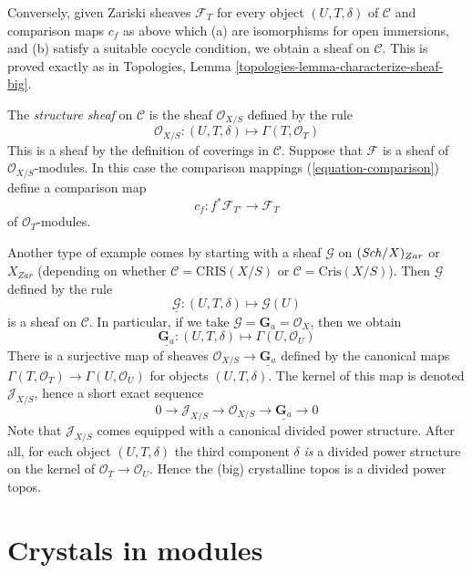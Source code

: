 \medskip\noindent
Conversely, given Zariski sheaves $\mathcal{F}_T$ for every object
$(U, T, \delta)$ of $\mathcal{C}$ and comparison maps
$c_f$ as above which (a) are isomorphisms for open immersions, and (b)
satisfy a suitable cocycle condition, we obtain a sheaf on
$\mathcal{C}$. This is proved exactly as in
Topologies, Lemma \ref{topologies-lemma-characterize-sheaf-big}.

\medskip\noindent
The {\it structure sheaf} on $\mathcal{C}$ is the sheaf
$\mathcal{O}_{X/S}$ defined by the rule
$$
\mathcal{O}_{X/S} :
(U, T, \delta)
\longmapsto
\Gamma(T, \mathcal{O}_T)
$$
This is a sheaf by the definition of coverings in $\mathcal{C}$.
Suppose that $\mathcal{F}$ is a sheaf of $\mathcal{O}_{X/S}$-modules.
In this case the comparison mappings (\ref{equation-comparison})
define a comparison map
\begin{equation}
\label{equation-comparison-modules}
c_f : f^*\mathcal{F}_{T'} \longrightarrow \mathcal{F}_T
\end{equation}
of $\mathcal{O}_T$-modules.

\medskip\noindent
Another type of example comes by starting with a sheaf
$\mathcal{G}$ on $(\mathit{Sch}/X)_{Zar}$ or $X_{Zar}$ (depending on whether
$\mathcal{C} = \text{CRIS}(X/S)$ or $\mathcal{C} = \text{Cris}(X/S)$).
Then $\underline{\mathcal{G}}$ defined by the rule
$$
\underline{\mathcal{G}} :
(U, T, \delta)
\longmapsto
\mathcal{G}(U)
$$
is a sheaf on $\mathcal{C}$. In particular, if we take
$\mathcal{G} = \mathbf{G}_a = \mathcal{O}_X$, then we obtain
$$
\underline{\mathbf{G}_a} :
(U, T, \delta)
\longmapsto
\Gamma(U, \mathcal{O}_U)
$$
There is a surjective map of sheaves
$\mathcal{O}_{X/S} \to \underline{\mathbf{G}_a}$ defined by the
canonical maps $\Gamma(T, \mathcal{O}_T) \to \Gamma(U, \mathcal{O}_U)$
for objects $(U, T, \delta)$. The kernel of this map is denoted
$\mathcal{J}_{X/S}$, hence a short exact sequence
$$
0 \to
\mathcal{J}_{X/S} \to
\mathcal{O}_{X/S} \to
\underline{\mathbf{G}_a} \to 0
$$
Note that $\mathcal{J}_{X/S}$ comes equipped with a canonical
divided power structure. After all, for each object $(U, T, \delta)$
the third component $\delta$ {\it is} a divided power structure on the
kernel of $\mathcal{O}_T \to \mathcal{O}_U$. Hence the (big)
crystalline topos is a divided power topos.





\section{Crystals in modules}
\label{section-crystals}

